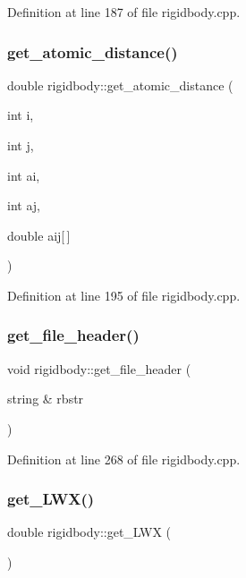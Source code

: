 Definition at line 187 of file rigidbody.\+cpp.

\mbox{\label{classrigidbody_ab60de6c5a1f3595ab4b6c87a2518acf6}} 
\subsubsection{\texorpdfstring{get\+\_\+atomic\+\_\+distance()}{get\_atomic\_distance()}}
{\footnotesize\ttfamily double rigidbody\+::get\+\_\+atomic\+\_\+distance (\begin{DoxyParamCaption}\item[{int}]{i,  }\item[{int}]{j,  }\item[{int}]{ai,  }\item[{int}]{aj,  }\item[{double}]{aij\mbox{[}$\,$\mbox{]} }\end{DoxyParamCaption})}



Definition at line 195 of file rigidbody.\+cpp.

\mbox{\label{classrigidbody_a0f3f1cbb05a92009e5831e657ee608cc}} 
\subsubsection{\texorpdfstring{get\+\_\+file\+\_\+header()}{get\_file\_header()}}
{\footnotesize\ttfamily void rigidbody\+::get\+\_\+file\+\_\+header (\begin{DoxyParamCaption}\item[{string \&}]{rbstr }\end{DoxyParamCaption})}



Definition at line 268 of file rigidbody.\+cpp.

\mbox{\label{classrigidbody_ae697251dbe67f538682959ccc7aacec0}} 
\subsubsection{\texorpdfstring{get\+\_\+\+L\+W\+X()}{get\_LWX()}}
{\footnotesize\ttfamily double rigidbody\+::get\+\_\+\+L\+WX (\begin{DoxyParamCaption}{ }\end{DoxyParamCaption})}



